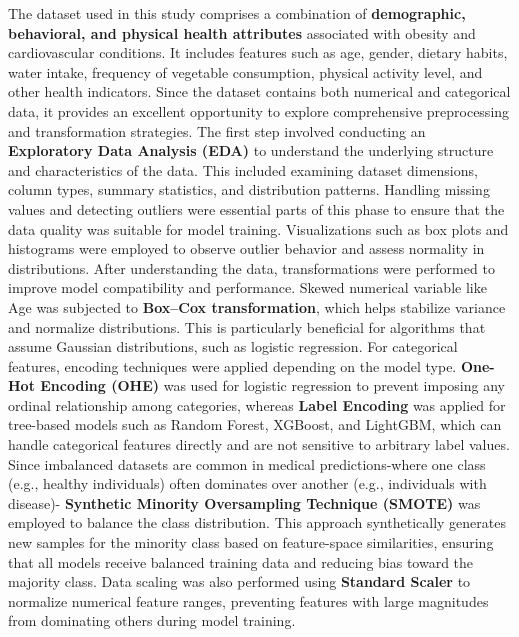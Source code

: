 The dataset used in this study comprises a combination of \textbf{demographic, behavioral, and physical health attributes} associated with obesity and cardiovascular conditions.
It includes features such as age, gender, dietary habits, water intake, frequency of vegetable consumption, physical activity level, and other health indicators.
Since the dataset contains both numerical and categorical data, it provides an excellent opportunity to explore comprehensive preprocessing and transformation strategies.
The first step involved conducting an \textbf{Exploratory Data Analysis (EDA)} to understand the underlying structure and characteristics of the data.
This included examining dataset dimensions, column types, summary statistics, and distribution patterns.
Handling missing values and detecting outliers were essential parts of this phase to ensure that the data quality was suitable for model training.
Visualizations such as box plots and histograms were employed to observe outlier behavior and assess normality in distributions.
After understanding the data, transformations were performed to improve model compatibility and performance.
Skewed numerical variable like Age was subjected to \textbf{Box–Cox transformation}, which helps stabilize variance and normalize distributions.
This is particularly beneficial for algorithms that assume Gaussian distributions, such as logistic regression.
For categorical features, encoding techniques were applied depending on the model type.
\textbf{One-Hot Encoding (OHE)} was used for logistic regression to prevent imposing any ordinal relationship among categories, whereas \textbf{Label Encoding} was applied for tree-based models such as Random Forest, XGBoost, and LightGBM, which can handle categorical features directly and are not sensitive to arbitrary label values.
Since imbalanced datasets are common in medical predictions-where one class (e.g., healthy individuals) often dominates over another (e.g., individuals with disease)- \textbf{Synthetic Minority Oversampling Technique (SMOTE)} was employed to balance the class distribution.
This approach synthetically generates new samples for the minority class based on feature-space similarities, ensuring that all models receive balanced training data and reducing bias toward the majority class.
Data scaling was also performed using \textbf{Standard Scaler} to normalize numerical feature ranges, preventing features with large magnitudes from dominating others during model training.

